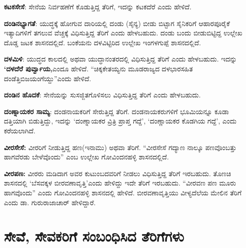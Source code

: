 \textbf{ಕಟಕಸೇಸೆ}: ಸೇನೆಯ ನಿರ್ವಹಣೆಗೆ ಕೊಡುತ್ತಿದ್ದ ತೆರಿಗೆ, ಇದನ್ನು ಕಟಕದೆರೆ ಎಂದು ಹೇಳಿದೆ.

\textbf{ದಂಡಿನಭ್ಯಾಗತೆ}: ಯುದ್ಧಕ್ಕೆ ಹೋಗುವ ದಾರಿಯಲ್ಲಿ ದಂಡು (ಸೈನ್ಯ) ಬೀಡು ಬಿಟ್ಟಾಗ ಸೈನಿಕರಿಗೆ ಆಹಾರಪೂರೈಕೆ ಇತ್ಯಾದಿಗಳಿಗೆ ತಗಲುವ ವೆಚ್ಚಕ್ಕೆ ವಿಧಿಸುತ್ತಿದ್ದ ತೆರಿಗೆ ಎಂದು ಹೇಳಬಹುದು. ದಂಡು ಬಂದು ಬೀಡುಬಿಟ್ಟಿದ್ದ ಉಲ್ಲೇಖ ದೊಡ್ಡ ಜಟಕ ಶಾಸನದಲ್ಲಿದೆ. ಬಂಕೆಯನು ದಳವಿಟ್ಟಿರಿದ ಉಲ್ಲೇಖ ಇಂಗಳಗುಪ್ಪೆ ಶಾಸನದಲ್ಲಿದೆ.

\textbf{ದಳಮಿಳಿ}: ಯುದ್ಧದ ಕಾಲದಲ್ಲಿ ಅಥವಾ ಯುದ್ಧಾನಂತರದಲ್ಲಿ ವಿಧಿಸುತ್ತಿದ್ದ ತೆರಿಗೆ ಎಂದು ಹೇಳಬಹುದು. ಇದನ್ನು \textbf{‘ದಳದೆರೆ ಪುರ್ವ್ವಾಯ,}ಎಂದೂ ಹೇಳಿದೆ. “ಚಿಕ್ಕಕೇತಯ್ಯನು ಮೂಡರಾಜ್ಯದ ದಳಭಾರಸಹಿತ ದಂಡೆತ್ತಿ\break ಬಿಜಯಂಗೆಯ್ದು”ಎಂದು ಹೇಳಿದೆ.

\textbf{ದಂಡಿನ ಹೊದಕೆ}: ಸೇನೆಯನ್ನು ಸುಸಜ್ಜಿತಗೊಳಿಸಲು ವಿಧಿಸುತ್ತಿದ್ದ ತೆರಿಗೆ ಎಂದು ಹೇಳಬಹುದು.

\textbf{ದಂಣ್ನಾಯಕರ ಸಾಮ್ಯ}: ದಂಡನಾಯಕರಿಗೆ ಸೇರುತ್ತಿದ್ದ ತೆರಿಗೆ. ದಂಡನಾಯಕರುಗಳಿಗೆ ಭೂಮಿಯನ್ನೂ ಕೂಡಾ ದತ್ತಿಯಾಗಿ ಬಿಡುತ್ತಿದ್ದು, ಇದನ್ನು ‘ದಂಣ್ನಾಯಕರ ವ್ರಿತ್ರಿ ಪ್ರಾಪ್ತ ಗದ್ದೆ’, ‘ದಂಣ್ಣಾಯಕರ ಕೊಡಗಿಯ ಗದ್ದೆ’, ಎಂದು ಕರೆಯಲಾಗಿದೆ.

\textbf{ವೀರಸೇಸೆ:} ವೀರರಿಗೆ ನೀಡುತ್ತಿದ್ದ ಹಣ(ಇನಾಮು) ಅಥವಾ ತೆರಿಗೆ. “ವೀರಸೇಸೆ ಗದ್ಯಾಣ ನಾಲ್ಕೂ ಪಣವೊಂಬತ್ತು ಹಾಗವೆರಡು ಬೇಳೆವೊಂದು” ಎಂಬ ಉಲ್ಲೇಖ ಗೋವಿಂದನಹಳ್ಳಿ ಶಾಸನದಲ್ಲಿದೆ.

\textbf{ವೀರಪಣ:} ವೀರರು ಮಡಿದಾಗ ಅವರ ಕುಟುಂಬದವರಿಗೆ ನೀಡಲು ವಿಧಿಸುತ್ತಿದ್ದ ತೆರಿಗೆ ಇರಬಹುದು. ತೊಣಚಿ ಶಾಸನದಲ್ಲಿ ‘ಬೆಸವಕ್ಕಳ ಬೀರವಣಾವೃತ್ತಿ’ಎಂದು ಹೇಳಿದ್ದು ಇದೇ ತೆರಿಗೆ ಇರಬಹುದು. “ವೀರವಣ ಪಣ ಮೂರು ಹಾಗವೊಂದು” ಎಂದು ಗೋವಿಂದನಹಳ್ಳಿ ಶಾಸನದಲ್ಲಿ ಹೇಳಿದೆ. ಬೀರವಣಾವೃತ್ತಿಯು ವೀಳ್ಯದೆಲೆಯ ಮೇಲಿನ ತೆರಿಗೆ ಎಂದು ಡಾ. ಗುರುರಾಜಾಚಾರ್​ ಹೇಳಿದ್ದಾರೆ.

\section*{ಸೇವೆ, ಸೇವಕರಿಗೆ ಸಂಬಂಧಿಸಿದ ತೆರಿಗೆಗಳು}


